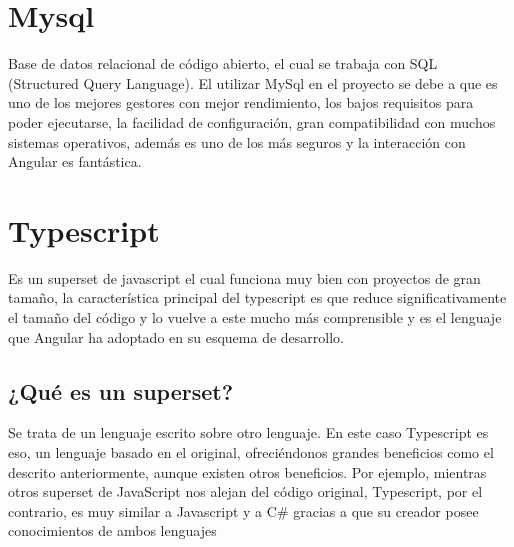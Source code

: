 \section{ Mysql}
Base de datos relacional de código abierto, el cual se trabaja con SQL (Structured Query Language).
El utilizar MySql en el proyecto se debe a que es uno de los mejores gestores con mejor rendimiento, los bajos requisitos para poder ejecutarse, la facilidad de configuración, gran compatibilidad con muchos sistemas operativos, además es uno de los más seguros y la interacción con Angular es fantástica. \cite{mysql}

\section{Typescript}
Es un superset de javascript el cual funciona muy bien con proyectos de gran tamaño, la característica principal del typescript es que reduce significativamente el tamaño del código y lo vuelve a este mucho más comprensible y es el lenguaje que Angular ha adoptado en su esquema de desarrollo.
\subsection{¿Qué es un superset?}

Se trata de un lenguaje escrito sobre otro lenguaje. En este caso Typescript es eso, un lenguaje basado en el original, ofreciéndonos grandes beneficios como el descrito anteriormente, aunque existen otros beneficios. Por ejemplo, mientras otros superset de JavaScript nos alejan del código original, Typescript, por el contrario, es muy similar a Javascript y a C# gracias a que su creador posee conocimientos de ambos lenguajes \cite{typeScript}
